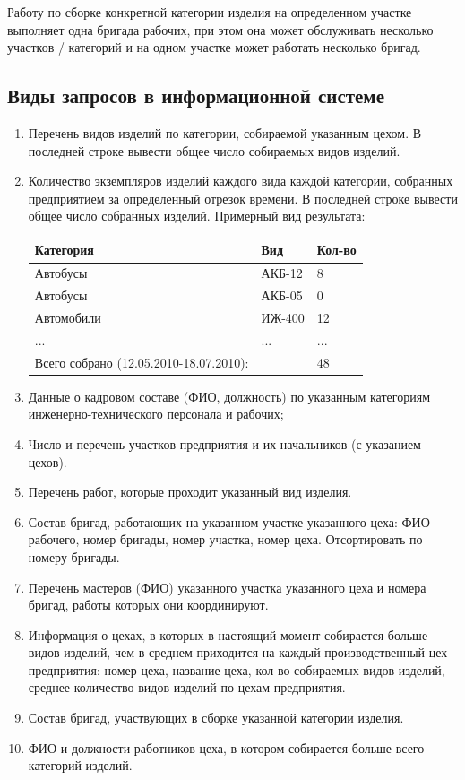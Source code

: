 Работу по сборке конкретной категории изделия на определенном участке выполняет одна бригада рабочих, при этом она может обслуживать несколько участков / категорий и на одном участке может работать несколько бригад.

\subsection{Виды запросов в информационной системе}
\begin{enumerate}

    \item Перечень видов изделий по категории, собираемой указанным цехом.
    В последней строке вывести общее число собираемых видов изделий.

    \item Количество экземпляров изделий каждого вида каждой категории, собранных предприятием за определенный отрезок времени.
    В последней строке вывести общее число собранных изделий.
    Примерный вид результата:

    \begin{tabular}{|p{6cm}|p{2cm}|p{1cm}|} \hline
        Категория & Вид & Кол-во \\ \hline
        Автобусы & АКБ-12 & 8 \\ \hline
        Автобусы & АКБ-05 & 0 \\ \hline
        Автомобили & ИЖ-400 & 12 \\ \hline
        ... & ... & ... \\ \hline
        Всего собрано (12.05.2010-18.07.2010): & & 48 \\ \hline
    \end{tabular}

    \item Данные о кадровом составе (ФИО, должность) по указанным категориям инженерно-технического персонала и рабочих;
    \item Число и перечень участков предприятия и их начальников (с указанием цехов).
    \item Перечень работ, которые проходит указанный вид изделия.
    \item Состав бригад, работающих на указанном участке указанного цеха: ФИО рабочего, номер бригады, номер участка, номер цеха. Отсортировать по номеру бригады.
    \item Перечень мастеров (ФИО) указанного участка указанного цеха и номера бригад, работы которых они координируют.
    \item Информация о цехах, в которых в настоящий момент собирается больше видов изделий, чем в среднем приходится на каждый производственный цех предприятия: номер цеха, название цеха, кол-во собираемых видов изделий, среднее количество видов изделий по цехам предприятия.
    \item Состав бригад, участвующих в сборке указанной категории изделия.
    \item ФИО и должности работников цеха, в котором собирается больше всего категорий изделий.

\end{enumerate}

